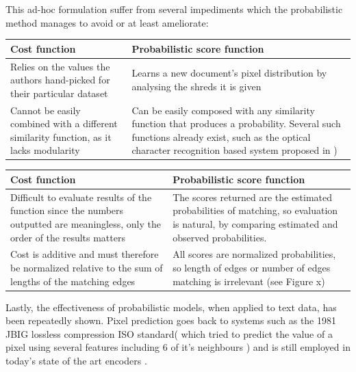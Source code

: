 This ad-hoc formulation suffer from several impediments which the probabilistic method manages to avoid or at least ameliorate:
\begin{table}[h]
  \centering
  \begin{tabular}{p{} | p{}}
  Cost function & Probabilistic score function \\ \hline
Relies on the values the authors hand-picked for their particular dataset & Learns a new document's pixel distribution by analysing the shreds it is given \\ \hline
Cannot be easily combined with a different similarity function, as it lacks modularity & Can be easily composed with any similarity function that produces a probability. Several such functions already exist, such as the optical character recognition based system proposed in \cite{P8}) \\ \hline
  \end{tabular}
  \label{tab:costScoreComp}
\end{table}
\begin{table}[h]
  \centering
  \begin{tabular}{p{} | p{}}
  Cost function & Probabilistic score function \\ \hline
Difficult to evaluate results of the function since the numbers outputted are meaningless, only the order of the results matters & The scores returned are the estimated probabilities of matching, so evaluation is natural, by comparing estimated and observed probabilities. \\ \hline
Cost is additive and must therefore be normalized relative to the sum of lengths of the matching edges & All scores are normalized probabilities, so length of edges or number of edges matching is irrelevant (see Figure x)  \\ \hline
  \end{tabular}
  \label{tab:costScoreComp}
\end{table}

Lastly, the effectiveness of probabilistic models, when applied to text data, has been repeatedly shown. Pixel prediction goes back to systems such as the 1981 JBIG lossless compression ISO standard( which tried to predict the value of a pixel using several features including 6 of it's neighbours \cite{P3} ) and is still employed in today's state of the art encoders \cite{P4}. 

